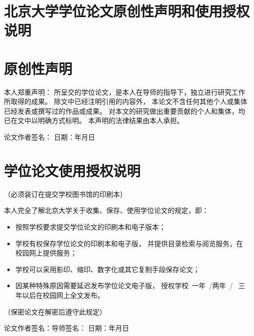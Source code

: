 \cleardoublepage
\section*{北京大学学位论文原创性声明和使用授权说明}
\vfill

\section*{原创性声明}

本人郑重声明：
所呈交的学位论文，是本人在导师的指导下，独立进行研究工作所取得的成果。
除文中已经注明引用的内容外，
本论文不含任何其他个人或集体已经发表或撰写过的作品或成果。
对本文的研究做出重要贡献的个人和集体，均已在文中以明确方式标明。
本声明的法律结果由本人承担。
\vspace{2.5em}\par

\rightline
{%
	论文作者签名：\hspace{5em}%
	日期：\hspace{2em}年\hspace{2em}月\hspace{2em}日%
}
\vfill

\section*{学位论文使用授权说明}
\vspace{-1em}\par
\centerline{（必须装订在提交学校图书馆的印刷本）}
\vspace{1em}\par

本人完全了解北京大学关于收集、保存、使用学位论文的规定，即：
\begin{itemize}\denselist
	\item 按照学校要求提交学位论文的印刷本和电子版本；
	\item 学校有权保存学位论文的印刷本和电子版，
		并提供目录检索与阅览服务，在校园网上提供服务；
	\item 学校可以采用影印、缩印、数字化或其它复制手段保存论文；
	\item 因某种特殊原因需要延迟发布学位论文电子版，
		授权学校~\Square\nbs{}一年~/\Square\nbs{}两年~/~%
		\Square\nbs{}三年以后在校园网上全文发布。
\end{itemize}
\par（保密论文在解密后遵守此规定）
\vspace{2.5em}\par

\rightline
{%
	论文作者签名：\hspace{5em}导师签名：\hspace{5em}%
	日期：\hspace{2em}年\hspace{2em}月\hspace{2em}日%
}

